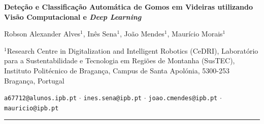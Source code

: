 \documentclass[12pt, a4paper]{article}
\begin{document}

\begin{center}
  {\LARGE \textbf{Deteção e Classificação Automática de Gomos em Videiras
  utilizando Visão Computacional e \textit{Deep Learning}}}

  \vspace{0.8em}

  {\large Robson Alexander Alves$^{1}$, Inês Sena$^{1}$,
          João Mendes$^{1}$, Maurício Morais$^{1}$}

  \vspace{0.4em}

  {\small $^{1}$Research Centre in Digitalization and Intelligent Robotics
  (CeDRI), Laboratório para a Sustentabilidade e Tecnologia em Regiões de
  Montanha (SusTEC), Instituto Politécnico de Bragança, Campus de Santa
  Apolónia, 5300-253 Bragança, Portugal}

  \vspace{0.2em}

  {\small \texttt{a67712@alunos.ipb.pt} $\cdot$
          \texttt{ines.sena@ipb.pt} $\cdot$
          \texttt{joao.cmendes@ipb.pt} $\cdot$
          \texttt{mauricio@ipb.pt}}
\end{center}

\vspace{1em}
\noindent\rule{\textwidth}{0.4pt}
\end{document}
